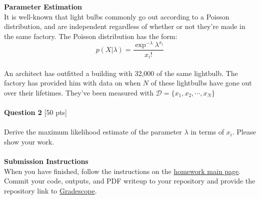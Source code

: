 \documentclass[paper=a4, fontsize=11pt]{scrartcl} %
\begin{document}
{\huge \textbf{Parameter Estimation}} \\

It is well-known that light bulbs commonly go out according to a Poisson distribution, and are independent regardless of whether or not they're made in the same factory. The Poisson distribution has the form: \\
\begin{equation}
p(X | \lambda) = \frac{ \exp^{-\lambda} \lambda ^{x_i}}{ x_i !} \nonumber
\end{equation} \\

An architect has outfitted a building with 32,000 of the same lightbulb. The factory has provided him with data on when $N$ of these lightbulbs have gone out over their lifetimes. They've been measured with $\mathcal{D} = \{ x_1, x_2, \cdots, x_N \}$\\
\\
{\Large \textbf{Question 2} [50 pts]} \\
\\
Derive the maximum likelihood estimate of the parameter $\lambda$ in terms of $x_i$. Please show your work. \\
\\


{\huge \textbf{Submission Instructions}} \\

When you have finished, follow the instructions on the \href{https://course.ccs.neu.edu/cs6220/homework-3/}{ homework main page}. Commit your code, outputs, and PDF writeup to your repository and provide the repository link to \href{https://www.gradescope.com}{Gradescope}.
\end{document}
